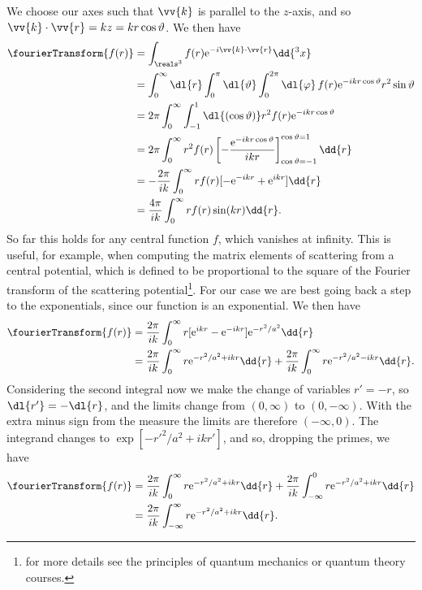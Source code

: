 \documentclass[fleqn]{NotesClass}
\newcommand*{\e}{\mathrm{e}}
\begin{document}
    We choose our axes such that \(\vv{k}\) is parallel to the \(z\)-axis, and so \(\vv{k} \cdot \vv{r} = kz = kr\cos\vartheta\).
    We then have
    \begin{align}
        \fourierTransform\{f(r)\} &= \int_{\reals^3} f(r) \e^{-i\vv{k}\cdot\vv{r}} \dd{^3x}\\
        &= \int_{0}^{\infty} \dl{r} \int_{0}^{\pi} \dl{\vartheta} \int_{0}^{2\pi} \dl{\varphi} \, f(r) \e^{-ikr\cos\vartheta} r^2\sin\vartheta\\
        &= 2\pi \int_{0}^{\infty} \int_{-1}^{1} \dl{(\cos \vartheta)} r^2 f(r) \e^{-ikr\cos\vartheta}\\
        &= 2\pi \int_{0}^{\infty} r^2 f(r) \left[ -\frac{\e^{-ikr\cos\vartheta}}{ikr} \right]_{\cos\vartheta=-1}^{\cos\vartheta=1} \dd{r}\\
        &= -\frac{2\pi}{ik} \int_{0}^{\infty} r f(r) [-\e^{-ikr} + \e^{ikr}] \dd{r}\\
        &= \frac{4\pi}{ik} \int_{0}^{\infty} r f(r) \sin(kr) \dd{r}.
    \end{align}
    So far this holds for any central function \(f\), which vanishes at infinity.
    This is useful, for example, when computing the matrix elements of scattering from a central potential, which is defined to be proportional to the square of the Fourier transform of the scattering potential\footnote{for more details see the principles of quantum mechanics or quantum theory courses.}.
    For our case we are best going back a step to the exponentials, since our function is an exponential.
    We then have
    \begin{align}
        \fourierTransform\{f(r)\} &= \frac{2\pi}{ik} \int_{0}^{\infty} r[\e^{ikr} - \e^{-ikr}]\e^{-r^2/a^2} \dd{r}\\
        &= \frac{2\pi}{ik} \int_{0}^{\infty} r\e^{-r^2/a^2 + ikr} \dd{r} + \frac{2\pi}{ik} \int_{0}^{\infty} r\e^{-r^2/a^2 - ikr} \dd{r}.
    \end{align}
    Considering the second integral now we make the change of variables \(r' = -r\), so \(\dl{r'} = -\dl{r}\), and the limits change from \((0, \infty)\) to \((0, -\infty)\).
    With the extra minus sign from the measure the limits are therefore \((-\infty, 0)\).
    The integrand changes to \(\exp[-r'^2/a^2 + ikr']\), and so, dropping the primes, we have
    \begin{align}
        \fourierTransform\{f(r)\} &= \frac{2\pi}{ik} \int_{0}^{\infty} r\e^{-r^2/a^2 + ikr} \dd{r} + \frac{2\pi}{ik} \int_{-\infty}^{0} r\e^{-r^2/a^2 + ikr} \dd{r}\\
        &= \frac{2\pi}{ik} \int_{-\infty}^{\infty} r\e^{-r^2/a^2 + ikr} \dd{r}.
    \end{align}
\end{document}
